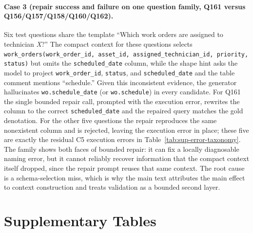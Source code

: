 \documentclass[11pt]{article}
\begin{document}
\paragraph{Case 3 (repair success and failure on one question family, Q161 versus Q156/Q157/Q158/Q160/Q162).} \sloppy Six test questions share the template ``Which work orders are assigned to technician \emph{X}?'' The compact context for these questions selects \texttt{work\_orders(work\_order\_id, asset\_id, assigned\_technician\_id, priority, status)} but omits the \texttt{scheduled\_date} column, while the shape hint asks the model to project \texttt{work\_order\_id}, \texttt{status}, and \texttt{scheduled\_date} and the table comment mentions ``schedule.'' Given this inconsistent evidence, the generator hallucinates \texttt{wo.schedule\_date} (or \texttt{wo.schedule}) in every candidate. For Q161 the single bounded repair call, prompted with the execution error, rewrites the column to the correct \texttt{scheduled\_date} and the repaired query matches the gold denotation. For the other five questions the repair reproduces the same nonexistent column and is rejected, leaving the execution error in place; these five are exactly the residual C5 execution errors in Table~\ref{tab:sup-error-taxonomy}. The family shows both faces of bounded repair: it can fix a locally diagnosable naming error, but it cannot reliably recover information that the compact context itself dropped, since the repair prompt reuses that same context. The root cause is a schema-selection miss, which is why the main text attributes the main effect to context construction and treats validation as a bounded second layer.

\section{Supplementary Tables}\label{sup:tables}
\end{document}
